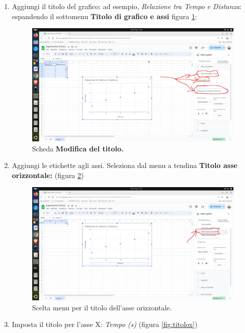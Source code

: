 \documentclass[12pt,a4paper,oneside]{book}
\theoremstyle{esercizio}
\begin{document}
\begin{enumerate}
    
    \item Aggiungi il titolo del grafico: ad esempio, \textit{Relazione tra Tempo e Distanza}: espandendo il sottomenu \textbf{Titolo di grafico e assi} figura \ref{fig:titolo}:
    
 \begin{figure}[h!]
    \centering
    \includegraphics[width=\linewidth]{img/titolo.png} 
    \caption{Scheda \textbf{Modifica del titolo.}}
    \label{fig:titolo}
\end{figure} 
    
    \item Aggiungi le etichette agli assi. Seleziona dal menu a tendina \textbf{Titolo asse orizzontale: } (figura \ref{fig:sceltax})
        \begin{figure}[h!]
    \centering
    \includegraphics[width=\linewidth]{img/sceltax.png} 
    \caption{Scelta menu per il titolo dell'asse orizzontale.}
    \label{fig:sceltax}
\end{figure}  
        
        
        \item Imposta il titolo per l'asse X: \textit{Tempo (s)} (figura \ref{fig:titolox})
        

\end{enumerate}
\end{document}

